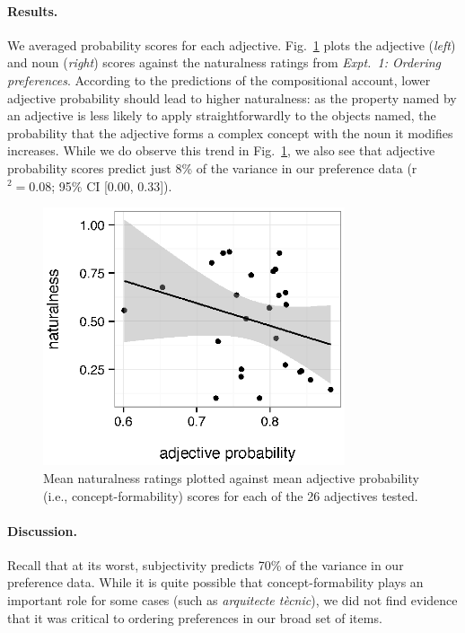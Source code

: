 \documentclass[12pt]{article}
\begin{document}
\paragraph{Results.} We averaged probability scores for each adjective. Fig.~\ref{fig:concept} plots the adjective (\emph{left}) and noun (\emph{right}) scores against the naturalness ratings from \emph{Expt.~1: Ordering preferences}. According to the predictions of the compositional account, lower adjective probability should lead to higher naturalness: as the property named by an adjective is less likely to apply straightforwardly to the objects named, the probability that the adjective forms a complex concept with the noun it modifies increases. While we do observe this trend in Fig.~\ref{fig:concept}, we also see that adjective probability scores predict just 8\% of the variance in our preference data (r$^{2}=0.08$; 95\% CI [0.00,  0.33]). %


\renewcommand\thefigure{S.\arabic{figure}}
\begin{figure}
	\centering\includegraphics[width=3.5in]{plots/naturalness-concept-adjective.eps}%
	\caption{Mean naturalness ratings plotted against mean adjective probability (i.e., concept-formability) scores for each of the 26 adjectives tested.}\label{fig:concept}
\end{figure}

\paragraph{Discussion.} Recall that at its worst, subjectivity predicts 70\% of the variance in our preference data. 
While it is quite possible that concept-formability plays an important role for some cases (such as \emph{arquitecte t\`{e}cnic}), we did not find evidence that it was critical to ordering preferences in our broad set of items. 
\end{document}
